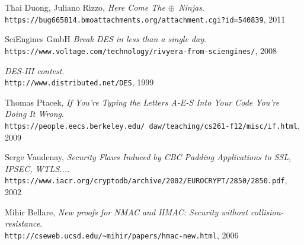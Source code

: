 \begin{thebibliography}{9}
Thai Duong, Juliano Rizzo, 
\textit{Here Come The $\mathbin{\oplus}$ Ninjas}. \\
\texttt{https://bug665814.bmoattachments.org/attachment.cgi?id=540839}, 2011

SciEngines GmbH
\textit{Break DES in less than a single day}. \\
\texttt{https://www.voltage.com/technology/rivyera-from-sciengines/}, 2008

\textit{DES-III contest}. \\
\texttt{http://www.distributed.net/DES}, 1999

Thomas Ptacek, 
\textit{If You’re Typing the Letters A-E-S Into Your Code You’re Doing It Wrong}. \\
\texttt{https://people.eecs.berkeley.edu/~daw/teaching/cs261-f12/misc/if.html}, 2009

Serge Vaudenay,
\textit{Security Flaws Induced by CBC Padding Applications to SSL, IPSEC, WTLS...}. \\
\texttt{https://www.iacr.org/cryptodb/archive/2002/EUROCRYPT/2850/2850.pdf}, 2002

Mihir Bellare,
\textit{New proofs for NMAC and HMAC: Security without collision-resistance}. \\
\texttt{http://cseweb.ucsd.edu/\textasciitilde mihir/papers/hmac-new.html}, 2006

\end{thebibliography}